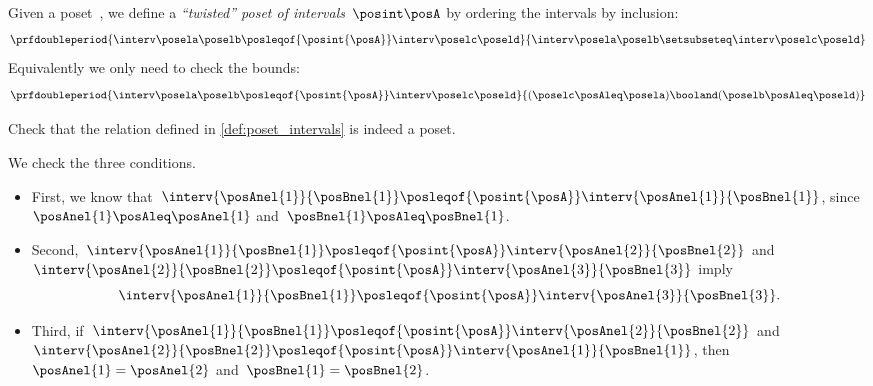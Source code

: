 \begin{marginfigure}
    \centering
    \caption{
        $\interv \posela \poselb
            \posleqof{\posint{\posA}}
            \interv \poselc \poseld$
    }
\end{marginfigure}

\begin{definition}
    \label{def:poset_intervals}
    Given a poset~\posA, we define a \emph{``twisted'' poset of intervals}~$\posint\posA$
    by ordering the intervals by inclusion:
    \begin{equation}\label{eq:twisted-1}
        \prfdoubleperiod{
            \interv \posela \poselb
            \posleqof{\posint{\posA}}
            \interv \poselc \poseld
        }{
            \interv \posela \poselb
            \setsubseteq
            \interv \poselc \poseld
        }
    \end{equation}
    Equivalently we only need to check the bounds:
    \begin{equation}\label{eq:twisted-2}
        \prfdoubleperiod{
            \interv \posela \poselb
            \posleqof{\posint{\posA}}
            \interv \poselc \poseld
        }{
            (\poselc \posAleq \posela ) \booland (\poselb \posAleq \poseld)
        }
    \end{equation}

\end{definition}

\begin{exercise}
    Check that the relation defined in \cref{def:poset_intervals} is indeed a poset.
\end{exercise}
\begin{solution}
    We check the three conditions.
    \begin{itemize}
        \item First, we know that~$\interv{\posAnel{1}}{\posBnel{1}}\posleqof{\posint{\posA}}\interv{\posAnel{1}}{\posBnel{1}}$, since~$\posAnel{1}\posAleq \posAnel{1}$ and~$\posBnel{1}\posAleq \posBnel{1}$.
        \item Second,~$\interv{\posAnel{1}}{\posBnel{1}}\posleqof{\posint{\posA}}\interv{\posAnel{2}}{\posBnel{2}}$ and~$\interv{\posAnel{2}}{\posBnel{2}}\posleqof{\posint{\posA}}\interv{\posAnel{3}}{\posBnel{3}}$ imply
              \begin{equation}
                  \interv{\posAnel{1}}{\posBnel{1}}\posleqof{\posint{\posA}}\interv{\posAnel{3}}{\posBnel{3}}.
              \end{equation}
        \item Third, if~$\interv{\posAnel{1}}{\posBnel{1}}\posleqof{\posint{\posA}}\interv{\posAnel{2}}{\posBnel{2}}$ and~$\interv{\posAnel{2}}{\posBnel{2}}\posleqof{\posint{\posA}}\interv{\posAnel{1}}{\posBnel{1}}$, then~$\posAnel{1}=\posAnel{2}$ and~$\posBnel{1}=\posBnel{2}$.
    \end{itemize}
\end{solution}

